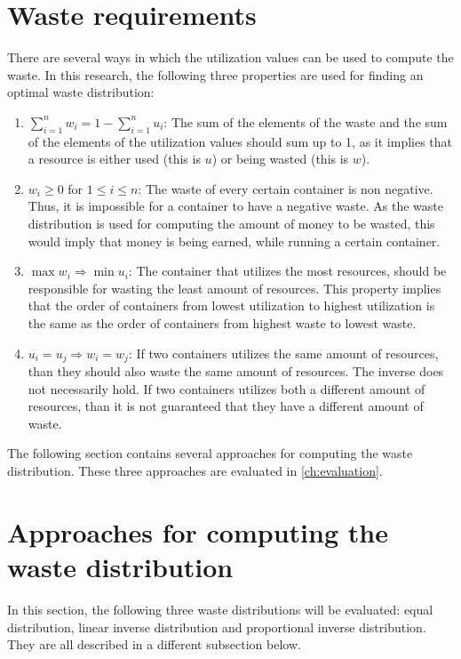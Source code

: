 \section{Waste requirements} \label{sec:waste_requirements}
There are several ways in which the utilization values can be used to compute the waste. In this research, the following three properties are used for finding an optimal waste distribution:
\begin{enumerate}
    \item \textbf{$\sum_{i=1}^n w_i = 1 - \sum_{i=1}^n u_i $}: The sum of the elements of the waste and the sum of the elements of the utilization values should sum up to 1, as it implies that a resource is either used (this is $u$) or being wasted (this is $w$).
    \item \textbf{$w_i \geq 0$} for $1 \leq i \leq n$: The waste of every certain container is non negative. Thus, it is impossible for a container to have a negative waste. As the waste distribution is used for computing the amount of money to be wasted, this would imply that money is being earned, while running a certain container.
    \item \textbf{$\max w_i \Rightarrow \min u_i$}: The container that utilizes the most resources, should be responsible for wasting the least amount of resources. This property implies that the order of containers from lowest utilization to highest utilization is the same as the order of containers from highest waste to lowest waste. 
    \item \textbf{$u_i = u_j \Rightarrow w_i = w_j $}: If two containers utilizes the same amount of resources, than they should also waste the same amount of resources. The inverse does not necessarily hold. If two containers utilizes both a different amount of resources, than it is not guaranteed that they have a different amount of waste.
\end{enumerate}

\noindent
The following section contains several approaches for computing the waste distribution. These three approaches are evaluated in \autoref{ch:evaluation}.

\section{Approaches for computing the waste distribution} \label{sec:approaches}
In this section, the following three waste distributions will be evaluated: equal distribution, linear inverse distribution and proportional inverse distribution. They are all described in a different subsection below.

